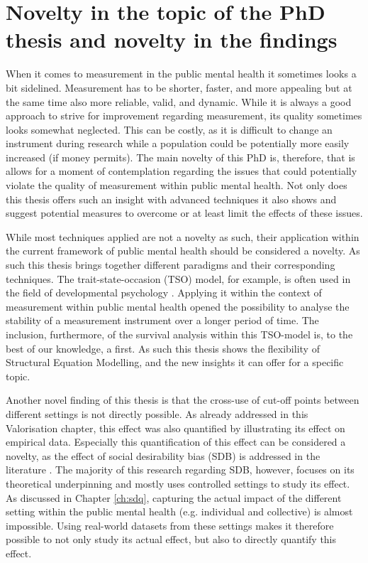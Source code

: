 \section*{Novelty in the topic of the PhD thesis and novelty in the findings}
When it comes to measurement in the public mental health it sometimes looks a bit sidelined. 
Measurement has to be shorter, faster, and more appealing but at the same time also more reliable, valid, and dynamic. 
While it is always a good approach to strive for improvement regarding measurement, its quality sometimes looks somewhat neglected. 
This can be costly, as it is difficult to change an instrument during research while a population could be potentially more easily increased (if money permits). 
The main novelty of this PhD is, therefore, that is allows for a moment of contemplation regarding the issues that could potentially violate the quality of measurement within public mental health. 
Not only does this thesis offers such an insight with advanced techniques it also shows and suggest potential measures to overcome or at least limit the effects of these issues. 

While most techniques applied are not a novelty as such, their application within the current framework of public mental health should be considered a novelty. 
As such this thesis brings together different paradigms and their corresponding techniques. 
The trait-state-occasion (TSO) model, for example, is often used in the field of developmental psychology \parencite{Cole_2012}. 
Applying it within the context of measurement within public mental health opened the possibility to analyse the stability of a measurement instrument over a longer period of time. 
The inclusion, furthermore, of the survival analysis within this TSO-model is, to the best of our knowledge, a first. 
As such this thesis shows the flexibility of Structural Equation Modelling, and the new insights it can offer for a specific topic. 

Another novel finding of this thesis is that the cross-use of cut-off points between different settings is not directly possible. As already addressed in this Valorisation chapter, this effect was also quantified by illustrating its effect on empirical data. 
Especially this quantification of this effect can be considered a novelty, as the effect of social desirability bias (SDB) is addressed in the literature \parencite{Krumpal_2013}. 
The majority of this research regarding SDB, however, focuses on its theoretical underpinning and mostly uses controlled settings to study its effect. 
As discussed in Chapter \ref{ch:sdq}, capturing the actual impact of the different setting within the public mental health (e.g. individual and collective) is almost impossible. 
Using real-world datasets from these settings makes it therefore possible to not only study its actual effect, but also to directly quantify this effect. 

